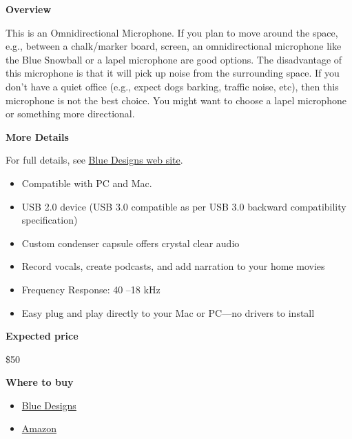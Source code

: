 \begin{gram}
\label{grm:equipment::bluesnow::overview}

\textbf{Overview}

This is an Omnidirectional Microphone. If you plan to move around the
space, e.g., between a chalk/marker board, screen, an omnidirectional
microphone like the Blue Snowball or a lapel microphone are good
options.
%
The disadvantage of this microphone is that it will pick up noise from the surrounding space.
%
If you don't have a quiet office (e.g., expect dogs barking, traffic noise, etc), then this microphone is not the best choice.  
%
You might want to choose a lapel microphone or something more directional.




\textbf{More Details}

For full details, see \href{https://www.bluedesigns.com/products/snowball-ice/}{Blue Designs web site}.

\begin{itemize}
\item
Compatible with PC and Mac.

\item  USB 2.0 device (USB 3.0 compatible as per USB 3.0 backward compatibility specification)

\item Custom condenser capsule offers crystal clear audio

\item Record vocals, create podcasts, and add narration to your home movies

\item Frequency Response: 40 –18 kHz

\item Easy plug and play directly to your Mac or PC—no drivers to install
\end{itemize}



\textbf{Expected price}

\$50


\textbf{Where to buy}


\begin{itemize}
\item 
\href{https://www.bluedesigns.com/products/snowball-ice/}{Blue Designs}

\item 
\href{https://www.amazon.com/Blue-Snowball-Condenser-Microphone-Cardioid/dp/B006DIA77E/ref=sxin_2_ac_d_rm?ac_md=1-1-c25vd2JhbGwgbWljcm9waG9uZQ%3D%3D-ac_d_rm&crid=35T8W1KNGCU61&cv_ct_cx=blue+yeti+usb+microphone&keywords=blue+yeti+usb+microphone&pd_rd_i=B006DIA77E&pd_rd_r=3aa58f9d-30b3-4a94-a0f9-899d4ec51554&pd_rd_w=TANss&pd_rd_wg=OOiJB&pf_rd_p=ec111f65-4a46-499c-be78-f47997212bd0&pf_rd_r=BKY12JJMDCSM54ABWTDX&psc=1&qid=1582900292&sprefix=Blue+ye,aps,168}{Amazon}
\end{itemize}

\end{gram}

